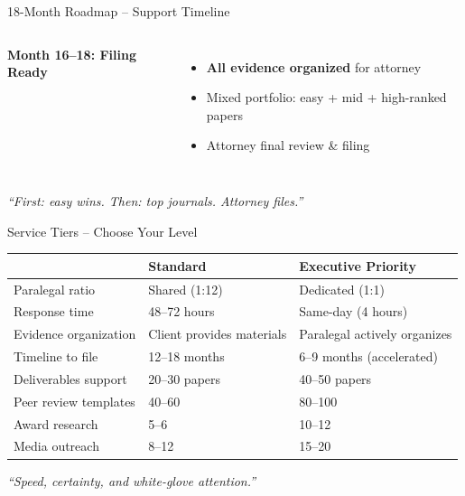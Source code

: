 \documentclass[aspectratio=169, 10pt]{beamer}
\begin{document}
\begin{frame}{18-Month Roadmap -- Support Timeline}
\begin{columns}[T]
			\textbf{Month 16--18: Filing Ready}
			\begin{itemize}
				\item \textbf{All evidence organized} for attorney
				\item Mixed portfolio: easy + mid + high-ranked papers
				\item Attorney final review \& filing
			\end{itemize}
		\end{columns}
		
		\vspace{0.2cm}
		\centering
		\textcolor{accentgold}{\textit{``First: easy wins. Then: top journals. Attorney files.''}}
	\end{frame}
	
	\begin{frame}{Service Tiers -- Choose Your Level}
		\begin{table}
			\centering
			\scriptsize
			\begin{tabular}{p{2.2cm}p{2.5cm}p{2.5cm}}
				\toprule
				& \textbf{Standard} & \textbf{Executive Priority} \\
				\midrule
				Paralegal ratio & Shared (1:12) & Dedicated (1:1) \\
				Response time & 48--72 hours & Same-day (4 hours) \\
				Evidence organization & Client provides materials & Paralegal actively organizes \\
				Timeline to file & 12--18 months & 6--9 months (accelerated) \\
				Deliverables support & 20--30 papers & 40--50 papers \\
				Peer review templates & 40--60 & 80--100 \\
				Award research & 5--6 & 10--12 \\
				Media outreach & 8--12 & 15--20 \\
				\bottomrule
			\end{tabular}
		\end{table}
		\centering
		\vspace{0.3cm}
		\textcolor{premiumpurple}{\textit{``Speed, certainty, and white-glove attention.''}}
	\end{frame}
	
\end{document}
